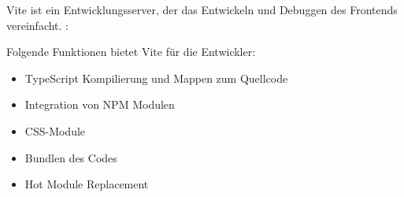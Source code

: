 

Vite ist ein Entwicklungsserver, der das Entwickeln und Debuggen des Frontends vereinfacht. \cite{ViteOverview}:

Folgende Funktionen bietet Vite für die Entwickler:

\begin{itemize}
    \item TypeScript Kompilierung und Mappen zum Quellcode
    \item Integration von NPM Modulen
    \item CSS-Module
    \item Bundlen des Codes
    \item Hot Module Replacement
\end{itemize}



